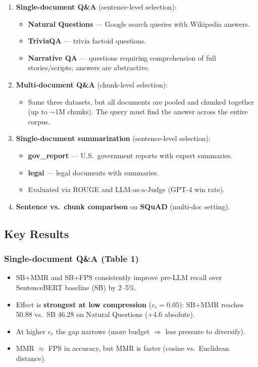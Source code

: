 \documentclass[11pt,a4paper]{article}
\begin{document}
\begin{enumerate}[leftmargin=*]
	\item \textbf{Single-document Q\&A} (sentence-level selection):
	      \begin{itemize}
		      \item \textbf{Natural Questions} --- Google search queries with Wikipedia answers.
		      \item \textbf{TriviaQA} --- trivia factoid questions.
		      \item \textbf{Narrative QA} --- questions requiring comprehension of full stories/scripts; answers are abstractive.
	      \end{itemize}
	\item \textbf{Multi-document Q\&A} (chunk-level selection):
	      \begin{itemize}
		      \item Same three datasets, but all documents are pooled and chunked together (up to $\sim$1M chunks). The query must find the answer across the entire corpus.
	      \end{itemize}
	\item \textbf{Single-document summarization} (sentence-level selection):
	      \begin{itemize}
		      \item \textbf{gov\_report} --- U.S.\ government reports with expert summaries.
		      \item \textbf{legal} --- legal documents with summaries.
		      \item Evaluated via ROUGE and LLM-as-a-Judge (GPT-4 win rate).
	      \end{itemize}
	\item \textbf{Sentence vs.\ chunk comparison} on \textbf{SQuAD} (multi-doc setting).
\end{enumerate}

\subsection{Key Results}

\subsubsection{Single-document Q\&A (Table 1)}

\begin{itemize}[leftmargin=*]
	\item SB+MMR and SB+FPS consistently improve pre-LLM recall over SentenceBERT baseline (SB) by 2--5\%.
	\item Effect is \textbf{strongest at low compression} ($c_r = 0.05$): SB+MMR reaches 50.88 vs.\ SB 46.28 on Natural Questions (+4.6 absolute).
	\item At higher $c_r$ the gap narrows (more budget $\Rightarrow$ less pressure to diversify).
	\item MMR $\approx$ FPS in accuracy, but MMR is faster (cosine vs.\ Euclidean distance).
\end{itemize}
\end{document}
